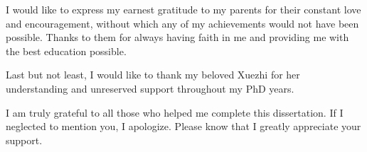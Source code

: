 \documentclass[12pt]{ZHU-cmuthesis}
\newcommand{\jc}[1]{{\footnotesize\color{blue}{[JC: #1]}}}
\begin{document}
\begin{acknowledgments}

I would like to express my earnest gratitude to my parents for their constant love and encouragement, without which any of my achievements would not have been possible. Thanks to them for always having faith in me and providing me with the best education possible.

Last but not least, I would like to thank my beloved Xuezhi for her understanding and unreserved support throughout my PhD years.

I am truly grateful to all those who helped me complete this dissertation. If I neglected to
mention you, I apologize. Please know that I greatly appreciate your support.

\end{acknowledgments}



\tableofcontents
\listoffigures
\listoftables

\mainmatter


%
%
%
%
%
















\end{document}
